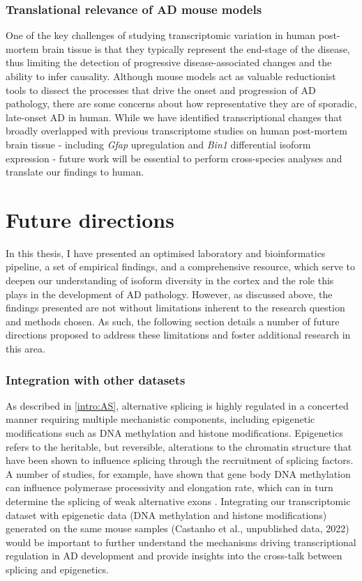 \subsubsection{Translational relevance of AD mouse models}
One of the key challenges of studying transcriptomic variation in human post-mortem brain tissue is that they typically represent the end-stage of the disease, thus limiting the detection of progressive disease-associated changes and the ability to infer causality. Although mouse models act as valuable reductionist tools to dissect the processes that drive the onset and progression of AD pathology, there are some concerns about how representative they are of sporadic, late-onset AD in human. While we have identified transcriptional changes that broadly overlapped with previous transcriptome studies on human post-mortem brain tissue - including \textit{Gfap} upregulation and \textit{Bin1} differential isoform expression - future work will be essential to perform cross-species analyses and translate our findings to human.      

\section{Future directions}
In this thesis, I have presented an optimised laboratory and bioinformatics pipeline, a set of empirical findings, and a comprehensive resource, which serve to deepen our understanding of isoform diversity in the cortex and the role this plays in the development of AD pathology. However, as discussed above, the findings presented are not without limitations inherent to the research question and methods chosen. As such, the following section details a number of future directions proposed to address these limitations and foster additional research in this area.   

\subsubsection{Integration with other datasets} 
As described in \cref{intro:AS}, alternative splicing is highly regulated in a concerted manner requiring multiple mechanistic components, including epigenetic modifications such as DNA methylation and histone modifications. Epigenetics refers to the heritable, but reversible, alterations to the chromatin structure that have been shown to influence splicing through the recruitment of splicing factors\cite{Yang2014, Shukla2011, Zhang2020a, Shukla2011, Luco2011}. A number of studies, for example, have shown that gene body DNA methylation can influence polymerase processivity and elongation rate, which can in turn determine the splicing of weak alternative exons \cite{Yang2014, Shukla2011}. Integrating our transcriptomic dataset with epigenetic data (DNA methylation and histone modifications) generated on the same mouse samples (Castanho et al., unpublished data, 2022) would be important to further understand the mechanisms driving transcriptional regulation in AD development and provide insights into the cross-talk between splicing and epigenetics. 

